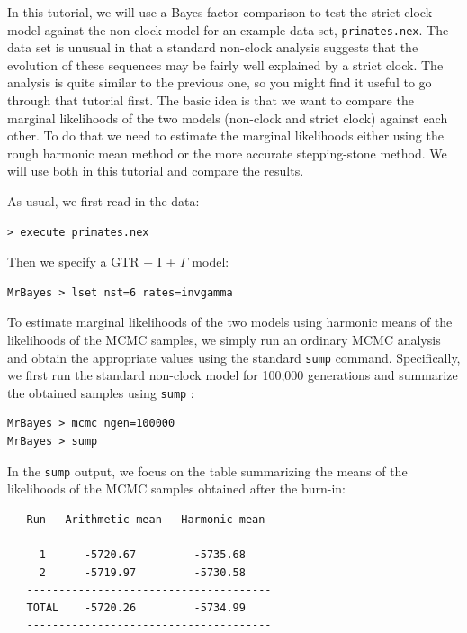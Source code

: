 \documentclass[12pt]{book}
\newcommand{\ttt}[1]{\texttt{#1} }
\begin{document}
In this tutorial, we will use a Bayes factor comparison to test the strict clock model against the
non-clock model for an example data set, \texttt{primates.nex}. The data set is unusual in that a
standard non-clock analysis suggests that the evolution of these sequences may be fairly well
explained by a strict clock. The analysis is quite similar to the previous one, so you might find
it useful to go through that tutorial first. The basic idea is that we want to compare the marginal
likelihoods of the two models (non-clock and strict clock) against each other. To do that we need
to estimate the marginal likelihoods either using the rough harmonic mean method or the more
accurate stepping-stone method. We will use both in this tutorial and compare the results.

As usual, we first read in the data:

\begin{verbatim}
> execute primates.nex
\end{verbatim}

Then we specify a GTR + I + $\Gamma$ model:

\begin{verbatim}
MrBayes > lset nst=6 rates=invgamma
\end{verbatim}

To estimate marginal likelihoods of the two models using harmonic means of the likelihoods of the
MCMC samples, we simply run an ordinary MCMC analysis and obtain the appropriate values using the
standard \texttt{sump} command. Specifically, we first run the standard non-clock model for 100,000
generations and summarize the obtained samples using \ttt{sump}:

\begin{singlespacing}
\begin{verbatim}
MrBayes > mcmc ngen=100000
MrBayes > sump
\end{verbatim}
\end{singlespacing}

In the \texttt{sump} output, we focus on the table summarizing the means of the likelihoods of the
MCMC samples obtained after the burn-in:

\begin{singlespacing}
\begin{verbatim}
   Run   Arithmetic mean   Harmonic mean
   --------------------------------------
     1      -5720.67         -5735.68
     2      -5719.97         -5730.58
   --------------------------------------
   TOTAL    -5720.26         -5734.99
   --------------------------------------
\end{verbatim}
\end{singlespacing}
\end{document}
